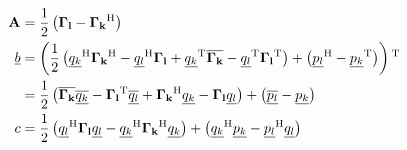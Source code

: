 \documentclass[a4paper,10pt]{article}
\begin{document}

\begin{equation} \label{eq:combined_oscillators}
\begin{split}
  \mathbf{A} & = \frac{1}{2} \left(\mathbf{\Gamma_l} - \mathbf{\Gamma_k}{}^{\textnormal{H}} \right) \\
  \underline{b} & = \left(\frac{1}{2} \left(
                                  \underline{q_k}{}^{\textnormal{H}} \mathbf{\Gamma_k}{}^{\textnormal{H}}
                                 -\underline{q_l}{}^{\textnormal{H}} \mathbf{\Gamma_l}
                                 +\underline{q_k}{}^{\textnormal{T}} \overline{\mathbf{\Gamma_k}}
                                 -\underline{q_l}{}^{\textnormal{T}} \mathbf{\Gamma_l}{}^{\textnormal{T}}
                                \right)
                + \left(\underline{p_l}{}^{\textnormal{H}} - \underline{p_k}{}^{\textnormal{T}}\right)
              \right){}^{\textnormal{T}} \\
          & = \frac{1}{2} \left(
                            \overline{\mathbf{\Gamma_k}} \overline{\underline{q_k}}
                           -\mathbf{\Gamma_l}{}^{\textnormal{T}} \overline{\underline{q_l}}
                           +\mathbf{\Gamma_k}{}^{\textnormal{H}} \underline{q_k}
                           -\mathbf{\Gamma_l} \underline{q_l}
                          \right)
              + \left(\overline{\underline{p_l}} - \underline{p_k}\right) \\
  c & = \frac{1}{2} \left(
                      \underline{q_l}{}^{\textnormal{H}} \mathbf{\Gamma_l} \underline{q_l}
                     -\underline{q_k}{}^{\textnormal{H}} \mathbf{\Gamma_k}{}^{\textnormal{H}} \underline{q_k}
                    \right)
        + \left(\underline{q_k}{}^{\textnormal{H}} \underline{p_k} - \underline{p_l}{}^{\textnormal{H}} \underline{q_l}\right)
\end{split}
\end{equation}

\end{document}
